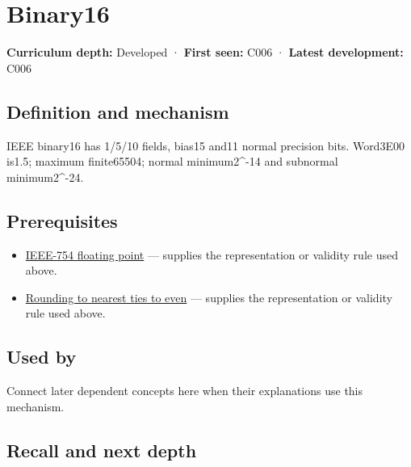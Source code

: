\hypertarget{appendix-34443cec7170}{}\label{referencestart:appendix-34443cec7170}
\section{Binary16}\label{appendix-34443cec7170-binary16}

\textbf{Curriculum depth:} Developed · \textbf{First seen:} C006 · \textbf{Latest development:} C006

\begin{allmightroledefinition}

\subsection{Definition and mechanism}\label{appendix-34443cec7170-definition-and-mechanism}

IEEE binary16 has 1/5/10 fields, bias15 and11 normal precision bits. Word3E00 is1.5; maximum finite65504; normal minimum2\^{}-14 and subnormal minimum2\^{}-24.

\end{allmightroledefinition}

\subsection{Prerequisites}\label{appendix-34443cec7170-prerequisites}

\begin{itemize}
\tightlist
\item
  \hyperref[appendix-343615f49ddf]{IEEE-754 floating point} --- supplies the representation or validity rule used above.
\item
  \hyperref[appendix-614afe1de592]{Rounding to nearest ties to even} --- supplies the representation or validity rule used above.
\end{itemize}

\subsection{Used by}\label{appendix-34443cec7170-used-by}

Connect later dependent concepts here when their explanations use this mechanism.

\subsection{Recall and next depth}\label{appendix-34443cec7170-recall-and-next-depth}

